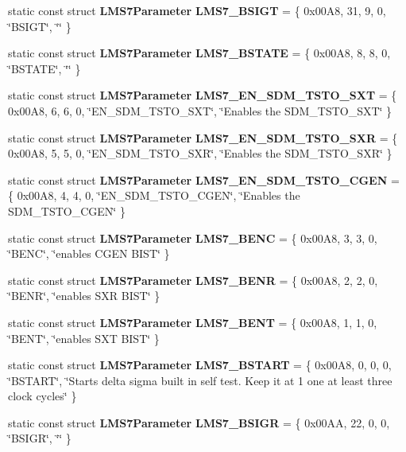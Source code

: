 \begin{DoxyCompactItemize}
\item 
static const struct {\bf L\+M\+S7\+Parameter} {\bf L\+M\+S7\+\_\+\+B\+S\+I\+GT} = \{ 0x00\+A8, 31, 9, 0, \char`\"{}\+B\+S\+I\+G\+T\char`\"{}, \char`\"{}\char`\"{} \}
\item 
static const struct {\bf L\+M\+S7\+Parameter} {\bf L\+M\+S7\+\_\+\+B\+S\+T\+A\+TE} = \{ 0x00\+A8, 8, 8, 0, \char`\"{}\+B\+S\+T\+A\+T\+E\char`\"{}, \char`\"{}\char`\"{} \}
\item 
static const struct {\bf L\+M\+S7\+Parameter} {\bf L\+M\+S7\+\_\+\+E\+N\+\_\+\+S\+D\+M\+\_\+\+T\+S\+T\+O\+\_\+\+S\+XT} = \{ 0x00\+A8, 6, 6, 0, \char`\"{}\+E\+N\+\_\+\+S\+D\+M\+\_\+\+T\+S\+T\+O\+\_\+\+S\+X\+T\char`\"{}, \char`\"{}\+Enables the S\+D\+M\+\_\+\+T\+S\+T\+O\+\_\+\+S\+X\+T\char`\"{} \}
\item 
static const struct {\bf L\+M\+S7\+Parameter} {\bf L\+M\+S7\+\_\+\+E\+N\+\_\+\+S\+D\+M\+\_\+\+T\+S\+T\+O\+\_\+\+S\+XR} = \{ 0x00\+A8, 5, 5, 0, \char`\"{}\+E\+N\+\_\+\+S\+D\+M\+\_\+\+T\+S\+T\+O\+\_\+\+S\+X\+R\char`\"{}, \char`\"{}\+Enables the S\+D\+M\+\_\+\+T\+S\+T\+O\+\_\+\+S\+X\+R\char`\"{} \}
\item 
static const struct {\bf L\+M\+S7\+Parameter} {\bf L\+M\+S7\+\_\+\+E\+N\+\_\+\+S\+D\+M\+\_\+\+T\+S\+T\+O\+\_\+\+C\+G\+EN} = \{ 0x00\+A8, 4, 4, 0, \char`\"{}\+E\+N\+\_\+\+S\+D\+M\+\_\+\+T\+S\+T\+O\+\_\+\+C\+G\+E\+N\char`\"{}, \char`\"{}\+Enables the S\+D\+M\+\_\+\+T\+S\+T\+O\+\_\+\+C\+G\+E\+N\char`\"{} \}
\item 
static const struct {\bf L\+M\+S7\+Parameter} {\bf L\+M\+S7\+\_\+\+B\+E\+NC} = \{ 0x00\+A8, 3, 3, 0, \char`\"{}\+B\+E\+N\+C\char`\"{}, \char`\"{}enables C\+G\+E\+N B\+I\+S\+T\char`\"{} \}
\item 
static const struct {\bf L\+M\+S7\+Parameter} {\bf L\+M\+S7\+\_\+\+B\+E\+NR} = \{ 0x00\+A8, 2, 2, 0, \char`\"{}\+B\+E\+N\+R\char`\"{}, \char`\"{}enables S\+X\+R B\+I\+S\+T\char`\"{} \}
\item 
static const struct {\bf L\+M\+S7\+Parameter} {\bf L\+M\+S7\+\_\+\+B\+E\+NT} = \{ 0x00\+A8, 1, 1, 0, \char`\"{}\+B\+E\+N\+T\char`\"{}, \char`\"{}enables S\+X\+T B\+I\+S\+T\char`\"{} \}
\item 
static const struct {\bf L\+M\+S7\+Parameter} {\bf L\+M\+S7\+\_\+\+B\+S\+T\+A\+RT} = \{ 0x00\+A8, 0, 0, 0, \char`\"{}\+B\+S\+T\+A\+R\+T\char`\"{}, \char`\"{}\+Starts delta sigma built in self test. Keep it at 1 one at least three clock cycles\char`\"{} \}
\item 
static const struct {\bf L\+M\+S7\+Parameter} {\bf L\+M\+S7\+\_\+\+B\+S\+I\+GR} = \{ 0x00\+A\+A, 22, 0, 0, \char`\"{}\+B\+S\+I\+G\+R\char`\"{}, \char`\"{}\char`\"{} \}

\end{DoxyCompactItemize}
